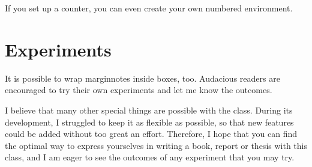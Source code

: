 \begin{kaobox}[frametitle=Title of the box]
\blindtext
\end{kaobox}

If you set up a counter, you can even create your own numbered 
environment.

\begin{kaocounter}
	\blindtext
\end{kaocounter}

\section{Experiments}

It is possible to wrap marginnotes inside boxes, too. Audacious readers 
are encouraged to try their own experiments and let me know the 
outcomes.


I believe that many other special things are possible with the 
 class. During its development, I struggled to keep it as 
flexible as possible, so that new features could be added without too 
great an effort. Therefore, I hope that you can find the optimal way to 
express yourselves in writing a book, report or thesis with this class, 
and I am eager to see the outcomes of any experiment that you may try.

